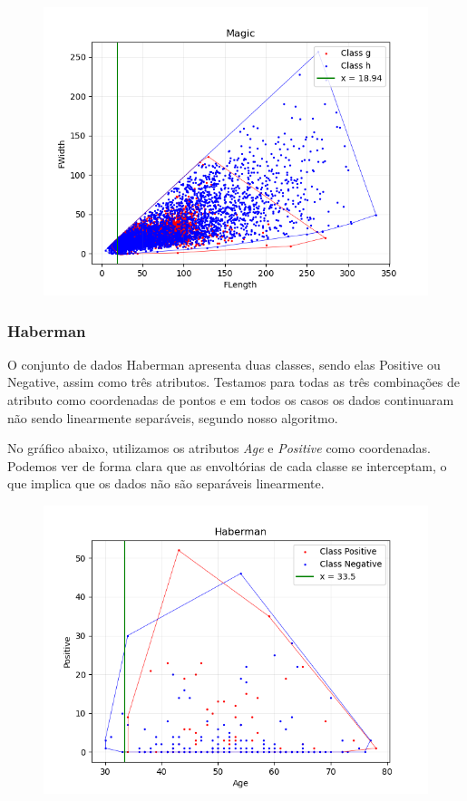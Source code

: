 \documentclass{article}
\begin{document}
\begin{figure} [H]
	\includegraphics[width=12cm]{magic.png}
	\centering
\end{figure}

\subsubsection{Haberman}

O conjunto de dados Haberman apresenta duas classes, sendo elas Positive ou Negative, assim como três atributos. Testamos para todas as três combinações de atributo como coordenadas de pontos e em todos os casos os dados continuaram não sendo linearmente separáveis, segundo nosso algoritmo.

No gráfico abaixo, utilizamos os atributos \textit{Age} e \textit{Positive} como coordenadas. Podemos ver de forma clara que as envoltórias de cada classe se interceptam, o que implica que os dados não são separáveis linearmente.

\begin{figure} [H]
	\includegraphics[width=12cm]{haberman.png}
	\centering
\end{figure}
\end{document}

